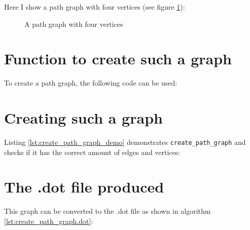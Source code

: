 Here I show a path graph with four vertices 
(see figure \ref{fig:create_path_graph}):

\begin{figure}
  \caption{A path graph with four vertices}
  \label{fig:create_path_graph}
\end{figure}

\section{Function to create such a graph}

To create a path graph, the following code can be used:



\section{Creating such a graph}

Listing \ref{lst:create_path_graph_demo}
demonstrates \verb;create_path_graph; 
and checks if it has the correct amount of edges and vertices:



\section{The .dot file produced}
\label{subsec:create_path_graph.dot}

This graph can be converted to the .dot file 
as shown in algorithm \ref{lst:create_path_graph.dot}:



